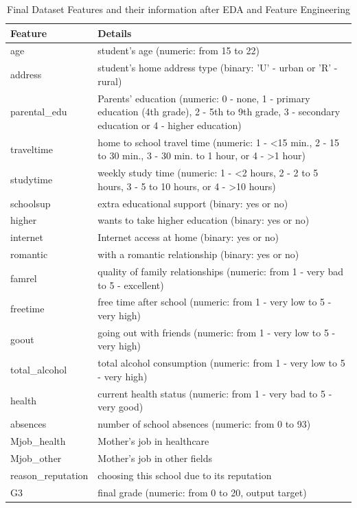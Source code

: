 \documentclass[11pt,a4paper]{article}
\begin{document}
\begin{table}[H]
\centering
\begin{tabular}{|p{4cm}|p{11cm}|}
\hline
Feature & Details \\ \hline
age & student's age (numeric: from 15 to 22)\\ \hline
address & student's home address type (binary: 'U' - urban or 'R' - rural)\\ \hline
parental\_edu & Parents' education (numeric: 0 - none, 1 - primary education (4th grade), 2 - 5th to 9th grade, 3 - secondary education or 4 - higher education)\\ \hline
traveltime & home to school travel time (numeric: 1 - <15 min., 2 - 15 to 30 min., 3 - 30 min. to 1 hour, or 4 - >1 hour) \\ \hline
studytime &  weekly study time (numeric: 1 - <2 hours, 2 - 2 to 5 hours, 3 - 5 to 10 hours, or 4 - >10 hours) \\ \hline
schoolsup & extra educational support (binary: yes or no) \\ \hline
higher & wants to take higher education (binary: yes or no) \\ \hline
internet & Internet access at home (binary: yes or no) \\ \hline
romantic &  with a romantic relationship (binary: yes or no) \\ \hline
famrel & quality of family relationships (numeric: from 1 - very bad to 5 - excellent) \\ \hline
freetime & free time after school (numeric: from 1 - very low to 5 - very high) \\ \hline
goout & going out with friends (numeric: from 1 - very low to 5 - very high) \\ \hline
total\_alcohol & total alcohol consumption (numeric: from 1 - very low to 5 - very high) \\ \hline
health & current health status (numeric: from 1 - very bad to 5 - very good) \\ \hline
absences & number of school absences (numeric: from 0 to 93) \\ \hline
Mjob\_health & Mother's job in healthcare \\ \hline
Mjob\_other & Mother's job in other fields \\ \hline
reason\_reputation & choosing this school due to its reputation \\ \hline
G3 & final grade (numeric: from 0 to 20, output target) \\ \hline
\end{tabular}
\caption{Final Dataset Features and their information after EDA and Feature Engineering}
\label{tab:finalfeatures}
\end{table}
\end{document}

